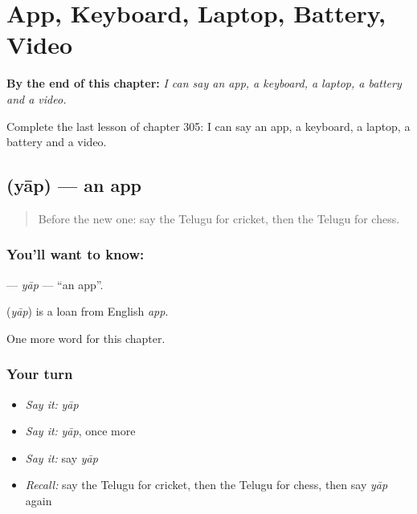 
\chapter{App, Keyboard, Laptop, Battery, Video}
\label{ch:te-app-keyboard-laptop-battery-video}

\begin{chapteropening}
\textbf{By the end of this chapter:} \emph{I can say an app, a keyboard, a laptop, a battery and a video.}

Complete the last lesson of chapter 305: I can say an app, a keyboard, a laptop, a battery and a video.
\end{chapteropening}

\section[\texorpdfstring{\te{యాప్} (yāp)}{యాప్ (yāp)}]{ (yāp) — an app}

\label{lesson:TE-C305-yap}



\begin{quote}
Before the new one: say the Telugu for cricket, then the Telugu for chess.
\end{quote}

\subsection*{You'll want to know: }
\textbf{} — \emph{yāp} — \textquotedblleft{}an app\textquotedblright{}.

\begin{cousinweb}
\textbf{} (\emph{yāp}) is a loan from English \emph{app}.
\end{cousinweb}

\begin{grammarlens}[title={What you've built}]
One more word for this chapter.
\end{grammarlens}

\subsection*{Your turn}
\begin{itemize}
\raggedright
  \item \emph{Say it:} \emph{yāp}
  \item \emph{Say it:} \emph{yāp}, once more
  \item \emph{Say it:} say \emph{yāp}
  \item \emph{Recall:} say the Telugu for cricket, then the Telugu for chess, then say \emph{yāp} again
\end{itemize}

